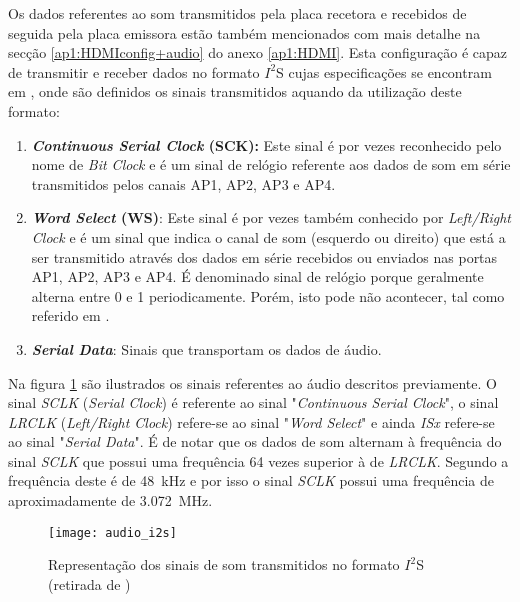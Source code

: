 Os dados referentes ao som transmitidos pela placa recetora e recebidos de seguida pela placa emissora estão também mencionados com mais detalhe na secção \ref{ap1:HDMIconfig+audio} do anexo \ref{ap1:HDMI}. Esta configuração é capaz de transmitir e receber dados no formato $I^{2}$S cujas especificações se encontram em \cite{R027}, onde são definidos os sinais transmitidos aquando da utilização deste formato:

\begin{enumerate}
	\item \textbf{\textit{Continuous Serial Clock} (SCK):} Este sinal é por vezes reconhecido pelo nome de \textit{Bit Clock} e é um sinal de relógio referente aos dados de som em série transmitidos pelos canais AP1, AP2, AP3 e AP4.
	
	\item \textbf{\textit{Word Select} (WS)}: Este sinal é por vezes também conhecido por \textit{Left/Right Clock} e é um sinal que indica o canal de som (esquerdo ou direito) que está a ser transmitido através dos dados em série recebidos ou enviados nas portas AP1, AP2, AP3 e AP4. É denominado sinal de relógio porque geralmente alterna entre 0 e 1 periodicamente. Porém, isto pode não acontecer, tal como referido em \cite{R027}. 
	
	\item \textbf{\textit{Serial Data}}: Sinais que transportam os dados de áudio.

\end{enumerate}

Na figura \ref{fig:i2s_audio} são ilustrados os sinais referentes ao áudio descritos previamente. O sinal \textit{SCLK} (\textit{Serial Clock}) é referente ao sinal "\textit{Continuous Serial Clock}", o sinal \textit{LRCLK} (\textit{Left/Right Clock}) refere-se ao sinal "\textit{Word Select}" e ainda \textit{ISx }refere-se ao sinal "\textit{Serial Data}". É de notar que os dados de som alternam à frequência do sinal \textit{SCLK} que possui uma frequência 64 vezes superior à de \textit{LRCLK}. Segundo \cite{R014} a frequência deste é de \SI{48}{\kilo\hertz} e por isso o sinal \textit{SCLK} possui uma frequência de aproximadamente de  \SI{3.072}{\mega\hertz}.

\begin{figure}[h!]
	\begin{center}
		\leavevmode
		\texttt{[image: audio\_i2s]}
		\caption[IRepresentação dos sinais de som transmitidos no formato $I^{2}$S]{Representação dos sinais de som transmitidos no formato $I^{2}$S (retirada de \cite{R016})}
		\label{fig:i2s_audio}
	\end{center}
\end{figure}

